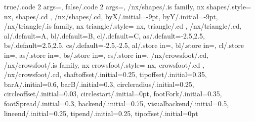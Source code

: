 {	true/.code 2 args={\nxCheckSuccessItem{}},%
	false/.code 2 args={\nxTimesDangerItem{}},%
	/nx/shapes/.is family,%
	nx shapes/.style={%
		nx, shapes/.cd%
	},%
	/nx/shapes/.cd,%
	byX/.initial=-9pt,%
	byY/.initial=-9pt,%
	/nx/triangle/.is family,%
  nx triangle/.style={%
		nx, triangle/.cd%
	},%
	/nx/triangle/.cd,%
	al/.default=A,%
	bl/.default=B,%
	cl/.default=C,%
	as/.default={-2.5,2.5},%
	bs/.default={2.5,2.5},%
	cs/.default={-2.5,-2.5},%
	al/.store in=\nx@AL,%
	bl/.store in=\nx@BL,%
	cl/.store in=\nx@CL,%
	as/.store in=\nx@AS,%
	bs/.store in=\nx@BS,%
	cs/.store in=\nx@CS,%
  /nx/crowsfoot/.cd,%
  /nx/crowsfoot/.is family,%
  nx crowsfoot/.style={%
		nx, crowsfoot/.cd%
	},%
  /nx/crowsfoot/.cd,%
  shaftoffset/.initial=0.25,%
  tipoffset/.initial=0.35,%
  barA/.initial=0.6,%
  barB/.initial=0.3,%
  circleradius/.initial=0.25,%
  circleoffset/.initial=0.03,%
	circlestart/.initial=0pt,%
  footFork/.initial=0.35,%
  footSpread/.initial=0.3,%
  backend/.initial=0.75,%
  visualbackend/.initial=0.5,%
  lineend/.initial=0.25,%
  tipend/.initial=0.25,%
  tipoffset/.initial=0pt%
}


